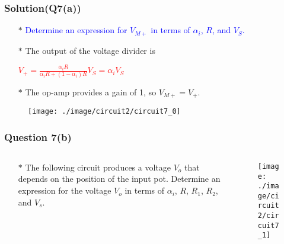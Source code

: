 \documentclass{beamer}
\newcommand{\blue}[1]{\textcolor{blue}{#1}}
\newcommand{\red}[1]{\textcolor{red}{#1}}
\begin{document}

\begin{frame}
\frametitle{Solution(Q7(a))}
\begin{itemize} \itemsep2pt \parskip0pt 
  \item[$\ast$] \blue{Determine an expression for $V_{M+}$ in terms of $\alpha_{i}$, $R$, and $V_S$.}
  \item[$\ast$] The output of the voltage divider is
  \item[] \hspace{3 cm} \red{$V_+ = \frac{\alpha_iR}{\alpha_iR + (1-\alpha_i)R}V_S = \alpha_iV_S$}
  \item[$\ast$] The op-amp provides a gain of 1, so $V_{M+} = V_+$.
\end{itemize}


\begin{figure}[H]
  \centering
  \texttt{[image: ./image/circuit2/circuit7\_0]}
\end{figure}

\end{frame}


\begin{frame}
\frametitle{Question 7(b)}
\begin{columns}
\begin{column}{6 cm}
\begin{itemize} \itemsep1pt \parskip0pt 
  \item[$\ast$] The following circuit produces a voltage $V_o$ that depends on the position of the input pot. Determine an expression for the voltage $V_o$ in terms of $\alpha_i$, $R$, $R_1$, $R_2$, and $V_s$.
\end{itemize}
\vspace{40 mm}
\end{column}
\begin{column}{6 cm}
\begin{figure}[H]
  \centering
  \texttt{[image: ./image/circuit2/circuit7\_1]}
\end{figure}
\end{column}
\end{columns}
\end{frame}

\end{document}
